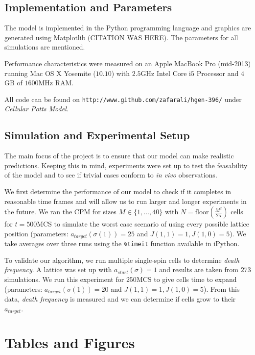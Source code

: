 \documentclass[12pt]{article}
\def\code#1{\texttt{#1}}
\begin{document}
\subsection{Implementation and Parameters}
The model is implemented in the Python programming language and graphics are generated using Matplotlib (CITATION WAS HERE). The parameters for all simulations are mentioned.

Performance characteristics were measured on an Apple MacBook Pro (mid-2013) running Mac OS X Yosemite ($10.10$) with $2.5$GHz Intel Core i$5$ Processor and $4$GB of $1600$MHz RAM.

All code can be found on \code{http://www.github.com/zafarali/hgen-396/} under \emph{Cellular Potts Model}.

\subsection{Simulation and Experimental Setup}
The main focus of the project is to ensure that our model can make realistic predictions. Keeping this in mind, experiments were set up to test the feasability of the model and to see if trivial cases conform to \emph{in vivo} observations. 

We first determine the performance of our model to check if it completes in reasonable time frames and will allow us to run larger and longer experiments in the future. We ran the CPM for sizes $M\in\{1, \ldots , 40\}$ with $N=\text{floor}(\frac{M^2}{25})$ cells for $t=500$MCS to simulate the worst case scenario of using every possible lattice position (parameters: $a_{target}(\sigma(1))=25$ and $J(1,1)=1, J(1,0)=5$). We take averages over three runs using the \code{\%timeit} function available in iPython.

To validate our algorithm, we run multiple single-spin cells to determine \emph{death frequency}. A lattice was set up with $a_{start}(\sigma)=1$ and results are taken from $273$ simulations. We run this experiment for $250$MCS to give cells time to expand (parameters: $a_{target}(\sigma(1))=20$ and $J(1,1)=1, J(1,0)=5$). From this data, \emph{death frequency} is measured and we can determine if cells grow to their $a_{target}$.



\pagebreak
\section{Tables and Figures}
\end{document}
